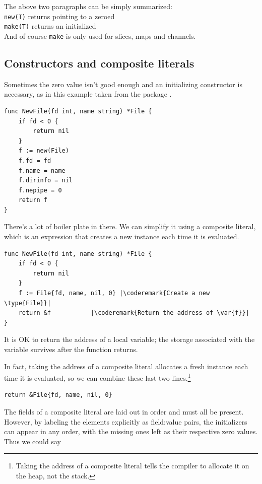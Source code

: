 \begin{lbar}
The above two paragraphs can be simply summarized:\\
\lstinline{new(T)} returns  pointing to a zeroed \\
\lstinline{make(T)} returns an initialized \\
And of course \lstinline{make} is only used for slices, maps and channels.
\end{lbar}

\subsection{Constructors and composite literals}
Sometimes the zero value isn't good enough and an initializing
constructor is necessary, as in this example taken from the package
.
\begin{lstlisting}
func NewFile(fd int, name string) *File {
    if fd < 0 {
        return nil
    }
    f := new(File)
    f.fd = fd
    f.name = name
    f.dirinfo = nil
    f.nepipe = 0
    return f
}
\end{lstlisting}
There's a lot of boiler plate in there. We can simplify it using a
composite literal, which is an expression that creates a new instance
each time it is evaluated.

\begin{lstlisting}
func NewFile(fd int, name string) *File {
    if fd < 0 {
        return nil
    }
    f := File{fd, name, nil, 0}	|\coderemark{Create a new \type{File}}|
    return &f			|\coderemark{Return the address of \var{f}}|
}
\end{lstlisting}
It is OK to return the address of a local variable;
the storage associated with the variable survives after the function
returns.

In fact, taking the address of a composite literal allocates a
fresh instance each time it is evaluated, so we can combine these last
two lines.\footnote{Taking the address of a composite literal tells the 
compiler to allocate it on the heap, not the stack.}
\begin{lstlisting}
return &File{fd, name, nil, 0}
\end{lstlisting}
The fields of a composite literal are laid out in order and must all be
present. However, by labeling the elements explicitly as field:value
pairs, the initializers can appear in any order, with the missing ones
left as their respective zero values. Thus we could say

